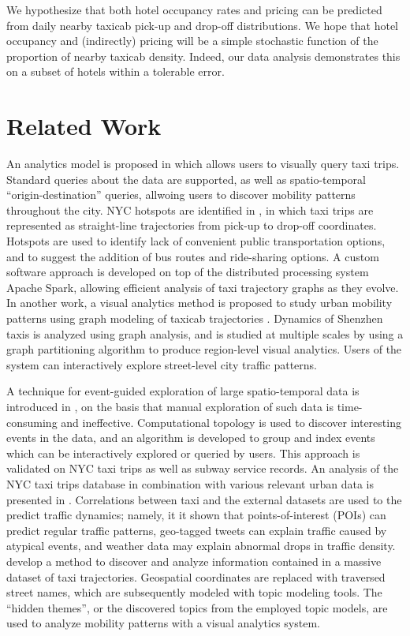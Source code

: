 \documentclass[useAMS, referee, usenatbib]{biom}
\begin{document}
We hypothesize that both hotel occupancy rates and pricing can be predicted from daily nearby taxicab pick-up and drop-off distributions. We hope that hotel occupancy and (indirectly) pricing will be a simple stochastic function of the proportion of nearby taxicab density. Indeed, our data analysis demonstrates this on a subset of hotels within a tolerable error.

\section{Related Work}
\label{s:related}

An analytics model is proposed in \citet{Ferreira2013VisualEO} which allows users to visually query taxi trips. Standard queries about the data are supported, as well as spatio-temporal ``origin-destination'' queries, allwoing users to discover mobility patterns throughout the city. NYC hotspots are identified in \citet{Stoyanovich2017ZoomingIO}, in which taxi trips are represented as straight-line trajectories from pick-up to drop-off coordinates. Hotspots are used to identify lack of convenient public transportation options, and to suggest the addition of bus routes and ride-sharing options. A custom software approach is developed on top of the distributed processing system Apache Spark, allowing efficient analysis of taxi trajectory graphs as they evolve. In another work, a visual analytics method is proposed to study urban mobility patterns using graph modeling of taxicab trajectories \citep{Huang2016TrajGraphAG}. Dynamics of Shenzhen taxis is analyzed using graph analysis, and is studied at multiple scales by using a graph partitioning algorithm to produce region-level visual analytics. Users of the system can interactively explore street-level city traffic patterns. 

A technique for event-guided exploration of large spatio-temporal data is introduced in \citet{Doraiswamy2014UsingTA}, on the basis that manual exploration of such data is time-consuming and ineffective. Computational topology is used to discover interesting events in the data, and an algorithm is developed to group and index events which can be interactively explored or queried by users. This approach is validated on NYC taxi trips as well as subway service records. An analysis of the NYC taxi trips database in combination with various relevant urban data is presented in \citet{Wu2016InterpretingTD}. Correlations between taxi and the external datasets are used to the predict traffic dynamics; namely, it it shown that points-of-interest (POIs) can predict regular traffic patterns, geo-tagged tweets can explain traffic caused by atypical events, and weather data may explain abnormal drops in traffic density. \citet{Chu2014VisualizingHT} develop a method to discover and analyze information contained in a massive dataset of taxi trajectories. Geospatial coordinates are replaced with traversed street names, which are subsequently modeled with topic modeling tools. The ``hidden themes'', or the discovered topics from the employed topic models, are used to analyze mobility patterns with a visual analytics system. 
\end{document}
